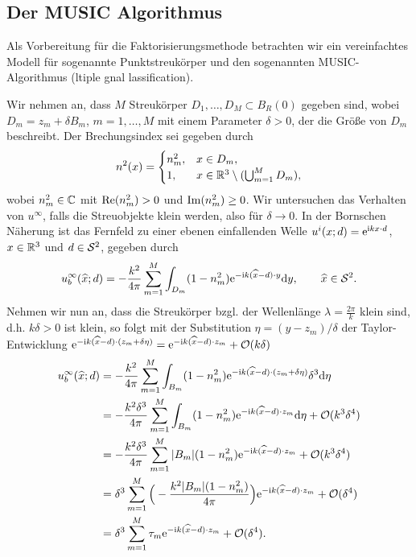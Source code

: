 \setcounter{subsection}{10}
\setcounter{section}{11}
\setcounter{mydef}{0}
\setcounter{equation}{0}

\subsection{Der MUSIC Algorithmus}
Als Vorbereitung für die Faktorisierungsmethode betrachten wir ein vereinfachtes Modell für sogenannte Punktstreukörper und den sogenannten MUSIC-Algorithmus (ltiple gnal lassification).

Wir nehmen an, dass \(M\) Streukörper \(D_1,\ldots,D_M\subset B_R(0)\) gegeben sind, wobei \(D_m=z_m+\delta B_m\), \(m=1,\ldots,M\) mit einem Parameter \(\delta>0\), der die Größe von \(D_m\) beschreibt. Der Brechungsindex sei gegeben durch
\begin{equation*}
	n^2(x)=
	\begin{cases}
		n_m^2,&x\in D_m,\\
		1,&x\in\mathbb{R}^3\setminus(\bigcup_{m=1}^MD_m),
	\end{cases}
\end{equation*}
wobei \(n_m^2\in\mathbb{C}\) mit \(\operatorname{Re}(n_m^2)>0\) und \(\operatorname{Im}(n_m^2)\geq0\). Wir untersuchen das Verhalten von \(u^\infty\), falls die Streuobjekte klein werden, also für \(\delta\to0\). In der Bornschen Näherung ist das Fernfeld zu einer ebenen einfallenden Welle \(u^i(x;d)=\mathrm{e}^{\mathrm{i} kx\cdot d}\), \(x\in\mathbb{R}^3\) und \(d\in\mathcal{S}^2\), gegeben durch
\begin{equation*}
	u_b^\infty(\widehat{x};d)=-\frac{k^2}{4\pi}\sum_{m=1}^M\int_{D_m}(1-n_m^2)\mathrm{e}^{-\mathrm{i} k(\widehat{x}-d)\cdot y}\mathrm{d}y,\qquad\widehat{x}\in\mathcal{S}^2.
\end{equation*}
Nehmen wir nun an, dass die Streukörper bzgl. der Wellenlänge \(\lambda=\frac{2\pi}{k}\) klein sind, d.h. \(k\delta>0\) ist klein, so folgt mit der Substitution \(\eta=(y-z_m)/\delta\) der Taylor-Entwicklung \(\mathrm{e}^{-\mathrm{i} k(\widehat{x}-d)\cdot(z_m+\delta\eta)}=\mathrm{e}^{-\mathrm{i} k(\widehat{x}-d)\cdot z_m}+\mathcal{O}(k\delta)\)
\begin{align*}
	u_b^\infty(\widehat{x};d)
	&=-\frac{k^2}{4\pi}\sum_{m=1}^M\int_{B_m}(1-n_m^2)\mathrm{e}^{-\mathrm{i} k(\widehat{x}-d)\cdot(z_m+\delta\eta)}\delta^3\mathrm{d}\eta\\
	&=-\frac{k^2\delta^3}{4\pi}\sum_{m=1}^M\int_{B_m}(1-n_m^2)\mathrm{e}^{-\mathrm{i} k(\widehat{x}-d)\cdot z_m}\mathrm{d}\eta+\mathcal{O}(k^3\delta^4)\\
	&=-\frac{k^2\delta^3}{4\pi}\sum_{m=1}^M|B_m|(1-n_m^2)\mathrm{e}^{-\mathrm{i} k(\widehat{x}-d)\cdot z_m}+\mathcal{O}(k^3\delta^4)\\
	&=\delta^3\sum_{m=1}^M\Big(-\frac{k^2|B_m|(1-n_m^2)}{4\pi}\Big)\mathrm{e}^{-\mathrm{i} k(\widehat{x}-d)\cdot z_m}+\mathcal{O}(\delta^4)\\
	&=\delta^3\sum_{m=1}^M\tau_m\mathrm{e}^{-\mathrm{i} k(\widehat{x}-d)\cdot z_m}+\mathcal{O}(\delta^4).
\end{align*}
